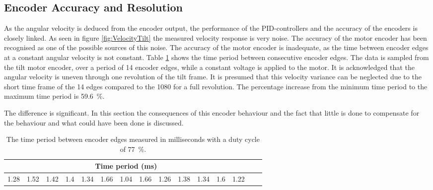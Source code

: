 \documentclass[../../main.tex]{subfiles}
\begin{document}
\subsection{Encoder Accuracy and Resolution}
As the angular velocity is deduced from the encoder output, the performance of the PID-controllers and the accuracy of the encoders is closely linked. As seen in figure \ref{fig:VelocityTilt} the measured velocity response is very noise. The accuracy of the motor encoder has been recognised as one of the possible sources of this noise. 
The accuracy of the motor encoder is inadequate, as the time between encoder edges at a constant angular velocity is not constant. Table \ref{tab:EncoderDifferenceBetweenEdges} shows the time period between consecutive encoder edges. The data is sampled from the tilt motor encoder, over a period of 14 encoder edges, while a constant voltage is applied to the motor. It is acknowledged that the angular velocity is uneven through one revolution of the tilt frame. It is presumed that this velocity variance can be neglected due to the short time frame of the 14 edges compared to the 1080 for a full revolution. 
The percentage increase from the minimum time period to the maximum time period is \SI{59.6}{\percent}.

The difference is significant. In this section the consequences of this encoder behaviour and the fact that little is done to compensate for the behaviour and what could have been done is discussed.

\begin{table}[H]
    \centering
    \begin{tabular}{c c c c c c c c c c c c c c c}
         \multicolumn{13}{c}{Time period (ms)} \\ \hline
         
         1.28 &
         1.52 &
         1.42 &
         1.4  &
         1.34 &
         1.66 &
         1.04 &
         1.66 &
         1.26 &
         1.38 &
         1.34 &
         1.6  &
         1.22 
       
    \end{tabular}
    \caption{The time period between encoder edges measured in milliseconds with a duty cycle of \SI{77}{\percent}.}
    \label{tab:EncoderDifferenceBetweenEdges}
\end{table}
\end{document}
